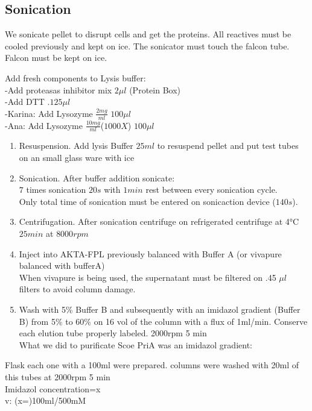 \documentclass[12pt,twoside]{reedthesis}
\begin{document}
{  \subsection{Sonication}\label{sonication}
  
  We sonicate pellet to disrupt cells and get the proteins. All reactives
  must be cooled previously and kept on ice. The sonicator must touch the
  falcon tube. Falcon must be kept on ice.
  
  Add fresh components to Lysis buffer:\\
  -Add proteasas inhibitor mix \(2\mu l\) (Protein Box)\\
  -Add DTT \(.1 25\mu l\)\\
  -Karina: Add Lysozyme \(\frac{2mg}{ml}\) \(100\mu l\)\\
  -Ana: Add Lysozyme \(\frac{10mg}{ml}\)(\(1000X\)) \(100\mu l\)
  
  \begin{enumerate}
  \def\labelenumi{\arabic{enumi}.}
  \setcounter{enumi}{1}
  \item
    Resuspension. Add lysis Buffer \(25ml\) to resuspend pellet and put
    test tubes on an small glass ware with ice
  \item
    Sonication. After buffer addition sonicate:\\
    \(7\) times sonication \(20s\) with \(1min\) rest between every
    sonication cycle.\\
    Only total time of sonication must be entered on sonicaction device
    (\(140s\)).
  \item
    Centrifugation. After sonication centrifuge on refrigerated centrifuge
    at 4°C \(25 min\) at \(8000 rpm\)
  \item
    Inject into AKTA-FPL previously balanced with Buffer A (or vivapure
    balanced with bufferA)\\
    When vivapure is being used, the supernatant must be filtered on .45
    \(\mu l\) filters to avoid column damage.
  \item
    Wash with 5\% Buffer B and subsequently with an imidazol gradient
    (Buffer B) from 5\% to 60\% on 16 vol of the column with a flux of
    1ml/min. Conserve each elution tube properly labeled. 2000rpm 5 min\\
    What we did to purificate Scoe PriA was an imidazol gradient:
  \end{enumerate}
  
  Flask each one with a 100ml were prepared. columns were washed with 20ml
  of this tubes at 2000rpm 5 min\\
  Imidazol concentration=x\\
  v: (x=)100ml/500mM
  
}
\end{document}
